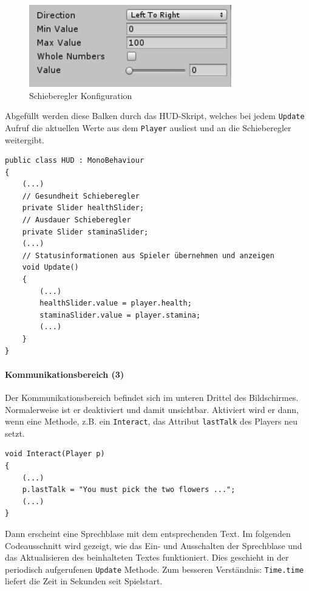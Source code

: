 \begin{figure}[H]
\includegraphics[scale=1]{screenshots/nullhundert.png}
\caption{Schieberegler Konfiguration}
\end{figure}

\noindent Abgefüllt werden diese Balken durch das HUD-Skript, welches bei jedem \lstinline{Update} Aufruf die aktuellen Werte aus dem \lstinline{Player} ausliest und an die Schieberegler weitergibt.

\begin{lstlisting}[caption={Schieberegler aktualisieren}]
public class HUD : MonoBehaviour
{
	(...)
	// Gesundheit Schieberegler
	private Slider healthSlider;
	// Ausdauer Schieberegler
	private Slider staminaSlider;
	(...)
	// Statusinformationen aus Spieler übernehmen und anzeigen
	void Update()
	{
		(...)
		healthSlider.value = player.health;
		staminaSlider.value = player.stamina;
		(...)
	}
}
\end{lstlisting}

\paragraph{Kommunikationsbereich (3)}
Der Kommunikationsbereich befindet sich im unteren Drittel des Bildschirmes.
Normalerweise ist er deaktiviert und damit unsichtbar.
Aktiviert wird er dann, wenn eine Methode, z.B. ein \lstinline{Interact}, das Attribut \lstinline{lastTalk} des Players neu setzt. 

\begin{lstlisting}[caption={Kommunikation setzen}]
void Interact(Player p)
{
	(...)
	p.lastTalk = "You must pick the two flowers ...";
	(...)
}
\end{lstlisting}

Dann erscheint eine Sprechblase mit dem entsprechenden Text. Im folgenden Codeausschnitt wird gezeigt, wie das Ein- und Ausschalten der Sprechblase und  das Aktualisieren des beinhalteten Textes funktioniert. Dies geschieht in der periodisch aufgerufenen \lstinline{Update} Methode. Zum besseren Verständnis: \lstinline{Time.time} liefert die Zeit in Sekunden seit Spielstart.

